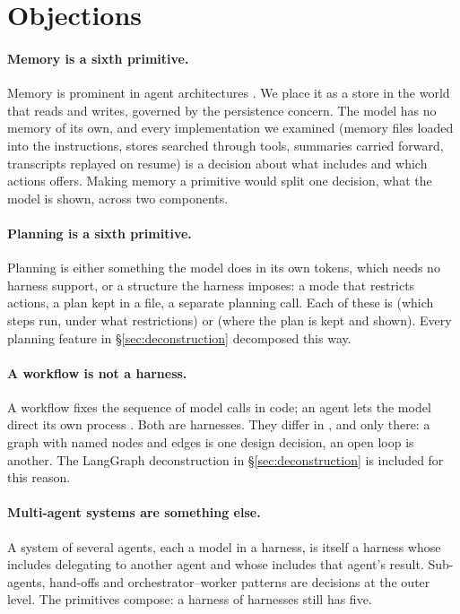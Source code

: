 \section{Objections}
\label{sec:objections}

\paragraph{Memory is a sixth primitive.} Memory is prominent in agent architectures \citep{sumers2024coala,packer2023memgpt}. We place it as a store in the world that  reads and  writes, governed by the persistence concern. The model has no memory of its own, and every implementation we examined (memory files loaded into the instructions, stores searched through tools, summaries carried forward, transcripts replayed on resume) is a decision about what  includes and which actions  offers. Making memory a primitive would split one decision, what the model is shown, across two components.

\paragraph{Planning is a sixth primitive.} Planning is either something the model does in its own tokens, which needs no harness support, or a structure the harness imposes: a mode that restricts actions, a plan kept in a file, a separate planning call. Each of these is  (which steps run, under what restrictions) or  (where the plan is kept and shown). Every planning feature in \S\ref{sec:deconstruction} decomposed this way.

\paragraph{A workflow is not a harness.} A workflow fixes the sequence of model calls in code; an agent lets the model direct its own process \citep{anthropic2024effective}. Both are harnesses. They differ in , and only there: a graph with named nodes and edges is one design decision, an open loop is another. The LangGraph deconstruction in \S\ref{sec:deconstruction} is included for this reason.

\paragraph{Multi-agent systems are something else.} A system of several agents, each a model in a harness, is itself a harness whose  includes delegating to another agent and whose  includes that agent's result. Sub-agents, hand-offs and orchestrator--worker patterns are  decisions at the outer level. The primitives compose: a harness of harnesses still has five.

